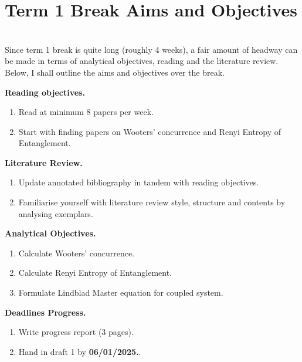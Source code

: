 \documentclass{article}
\begin{document}
\section*{Term 1 Break Aims and Objectives}
\\

Since term 1 break is quite long (roughly 4 weeks), a fair amount of headway can be made in terms of analytical objectives, reading and the literature review. Below, I shall outline the aims and objectives over the break.

\vspace{0.5cm}

\textbf{Reading objectives.}
\begin{enumerate}
    \item Read at minimum 8 papers per week.
    \item Start with finding papers on Wooters' concurrence and Renyi Entropy of Entanglement.
\end{enumerate}


\vspace{0.5cm}


\textbf{Literature Review.} 
\begin{enumerate}
    \item Update annotated bibliography in tandem with reading objectives.
    \item Familiarise yourself with literature review style, structure and contents by analysing exemplars.
\end{enumerate}


\vspace{0.5cm}


\textbf{Analytical Objectives.}
\begin{enumerate}
    \item Calculate Wooters' concurrence.
    \item Calculate Renyi Entropy of Entanglement.
    \item Formulate Lindblad Master equation for coupled system. 
\end{enumerate}


\vspace{0.5cm}


\textbf{Deadlines Progress.}
\begin{enumerate}
    \item Write progress report (3 pages).
    \item Hand in draft 1 by \textbf{06/01/2025.}.
\end{enumerate}
\end{document}

